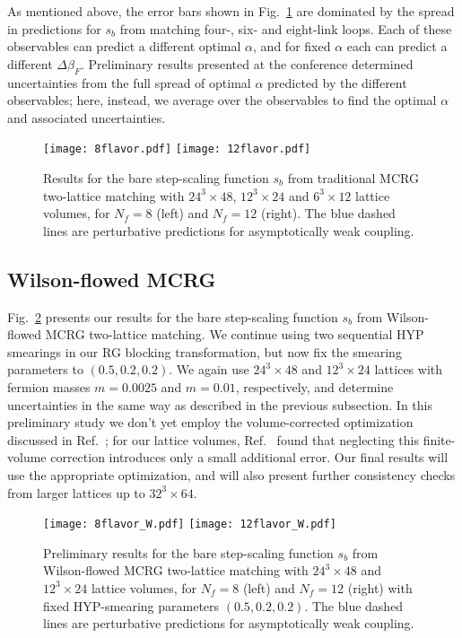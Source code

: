 \documentclass{PoS}
\newcommand{\al}{\ensuremath{\alpha} }
\newcommand{\be}{\ensuremath{\beta} }
\newcommand{\De}{\ensuremath{\Delta} }
\newcommand{\X}{\ensuremath{\!\times\!} }
\newcommand{\refcite}[1]{Ref.~\cite{#1}}
\newcommand{\fig}[1]{Fig.~\ref{#1}}
\begin{document}
As mentioned above, the error bars shown in \fig{fig:MCRG} are dominated by the spread in predictions for $s_b$ from matching four-, six- and eight-link loops.
Each of these observables can predict a different optimal $\al$, and for fixed \al each can predict a different $\De\be_F$.
Preliminary results presented at the conference determined uncertainties from the full spread of optimal \al predicted by the different observables; here, instead, we average over the observables to find the optimal \al and associated uncertainties. %

\begin{figure}[htpb]
  \texttt{[image: 8flavor.pdf]}\hfill
  \texttt{[image: 12flavor.pdf]}
  \caption{Results for the bare step-scaling function $s_b$ from traditional MCRG two-lattice matching with $24^3\X48$, $12^3\X24$ and $6^3\X12$ lattice volumes, for $N_f = 8$ (left) and $N_f = 12$ (right).  The blue dashed lines are perturbative predictions for asymptotically weak coupling.}
  \label{fig:MCRG}
\end{figure}



\subsection{\label{sec:WMCRGresults}Wilson-flowed MCRG} %
\fig{fig:WMCRG} presents our results for the bare step-scaling function $s_b$ from Wilson-flowed MCRG two-lattice matching.
We continue using two sequential HYP smearings in our RG blocking transformation, but now fix the smearing parameters to $(0.5, 0.2, 0.2)$.
We again use $24^3\X48$ and $12^3\X24$ lattices with fermion masses $m = 0.0025$ and $m = 0.01$, respectively, and determine uncertainties in the same way as described in the previous subsection.
In this preliminary study we don't yet employ the volume-corrected optimization discussed in \refcite{Hasenfratz:2011xn}; for our lattice volumes, \refcite{Hasenfratz:2011xn} found that neglecting this finite-volume correction introduces only a small additional error.
Our final results will use the appropriate optimization, and will also present further consistency checks from larger lattices up to $32^3\X64$.

\begin{figure}[htpb]
  \texttt{[image: 8flavor\_W.pdf]}\hfill
  \texttt{[image: 12flavor\_W.pdf]}
  \caption{Preliminary results for the bare step-scaling function $s_b$ from Wilson-flowed MCRG two-lattice matching with $24^3\X48$ and $12^3\X24$ lattice volumes, for $N_f = 8$ (left) and $N_f = 12$ (right) with fixed HYP-smearing parameters $(0.5, 0.2, 0.2)$.  The blue dashed lines are perturbative predictions for asymptotically weak coupling.}
  \label{fig:WMCRG}
\end{figure}
\end{document}
